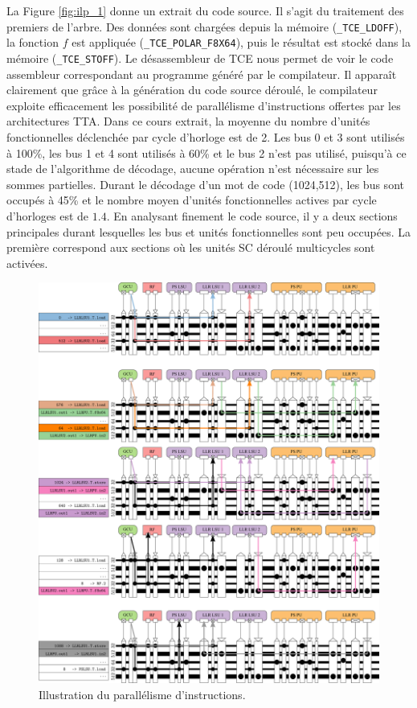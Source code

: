 La Figure \ref{fig:ilp_1} donne un extrait du code source. Il s'agit du traitement des premiers \noeuds de l'arbre. Des données sont chargées depuis la mémoire (\texttt{\_TCE\_LDOFF}), la fonction $f$ est appliquée (\texttt{\_TCE\_POLAR\_F8X64}), puis le résultat est stocké dans la mémoire (\texttt{\_TCE\_STOFF}). Le désassembleur de TCE nous permet de voir le code assembleur correspondant au programme généré par le compilateur. Il apparaît clairement que grâce à la génération du code source déroulé, le compilateur exploite efficacement les possibilité de parallélisme d'instructions offertes par les architectures TTA. Dans ce cours extrait, la moyenne du nombre d'unités fonctionnelles déclenchée par cycle d'horloge est de 2. Les bus 0 et 3 sont utilisés à 100\%, les bus 1 et 4 sont utilisés à 60\% et le bus 2 n'est pas utilisé, puisqu'à ce stade de l'algorithme de décodage, aucune opération n'est nécessaire sur les sommes partielles. Durant le décodage d'un mot de code (1024,512), les bus sont occupés à 45\% et le nombre moyen d'unités fonctionnelles actives par cycle d'horloges est de $1.4$. En analysant finement le code source, il y a deux sections principales durant lesquelles les bus et unités fonctionnelles sont peu occupées. La première correspond aux sections où les unités \og SC déroulé \fg multicycles sont activées. 
\begin{figure}[htp]
\centering
\includegraphics[width=\textwidth]{main/ch4_fig/ilp_2}
\caption{Illustration du parallélisme d'instructions.}
\label{fig:ilp_2}
\end{figure}
